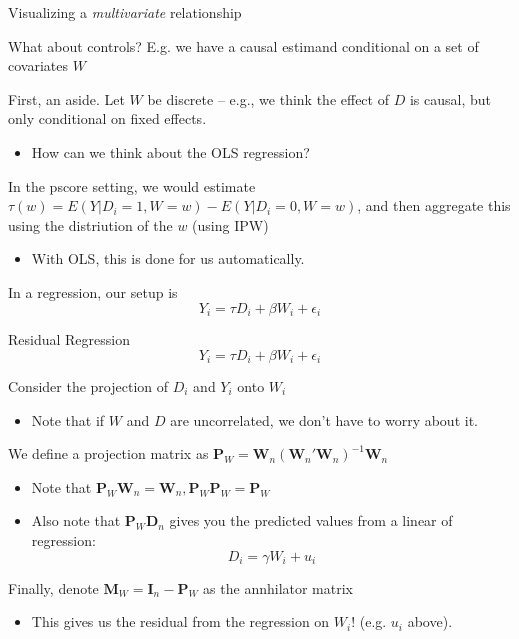 \documentclass[notes,11pt, aspectratio=169]{beamer}
\newenvironment{wideitemize}{\itemize\addtolength{\itemsep}{10pt}}{\enditemize}
\begin{document}
\begin{frame}{Visualizing a \emph{multivariate} relationship}
  \begin{wideitemize}
  \item What about controls? E.g. we have a causal estimand conditional on a set of covariates $W$
  \item First, an aside. Let $W$ be discrete -- e.g., we think the
    effect of $D$ is causal, but only conditional on fixed effects.
    \begin{itemize}
    \item How can we think about the OLS regression?
    \end{itemize}
  \item In the pscore setting, we would estimate
    $\tau(w) = E(Y|D_{i}=1, W=w) - E(Y | D_{i} = 0, W = w)$, and then
    aggregate this using the distriution of the $w$ (using IPW)
    \begin{itemize}
    \item With OLS, this is done for us automatically.
    \end{itemize}
  \item In a regression, our setup is
    $$ Y_{i} = \tau D_{i} + \beta W_{i} + \epsilon_{i}$$
  \end{wideitemize}
\end{frame}

\begin{frame}{Residual Regression}
    $$ Y_{i} = \tau D_{i} + \beta W_{i} + \epsilon_{i}$$
  \begin{wideitemize}
  \item Consider the projection of $D_{i}$ and $Y_{i}$ onto $W_{i}$ 
    \begin{itemize}
      \item Note that if $W$ and $D$ are uncorrelated, we don't have to worry about it.
      \end{itemize}
    \item We define a projection matrix as $\mathbf{P}_{W} = \mathbf{W}_{n}(\mathbf{W}_{n}'\mathbf{W}_{n})^{-1}\mathbf{W}_{n}$
      \begin{itemize}
      \item Note that $\mathbf{P}_{W}\mathbf{W}_{n} = \mathbf{W}_{n}, \mathbf{P}_{W}\mathbf{P}_{W} = \mathbf{P}_{W}$
      \item Also note that $\mathbf{P}_{W}\mathbf{D}_{n}$ gives you
        the predicted values from a linear of regression:
        $$D_{i} = \gamma W_{i} + u_{i}$$
      \end{itemize}
    \item Finally, denote $\mathbf{M}_{W} = \mathbf{I}_{n} - \mathbf{P}_{W}$ as the annhilator matrix
      \begin{itemize}
      \item This gives us the residual from the regression on $W_{i}$! (e.g. $u_{i}$ above).
      \end{itemize}
  \end{wideitemize}
\end{frame}
\end{document}
